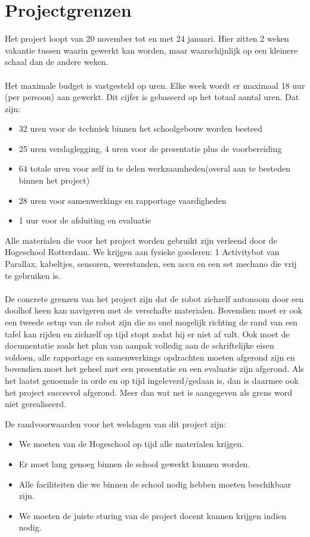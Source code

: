 \documentclass[oneside]{book}
\begin{document}
\clearpage
\chapter{Projectgrenzen}
Het project loopt van 20 november tot en met 24 januari. Hier zitten 2 weken vakantie tussen
waarin gewerkt kan worden, maar waarschijnlijk op een kleinere schaal dan de andere weken.\\
\\
Het maximale budget is vastgesteld op uren. Elke week wordt er maximaal 18 uur (per persoon) aan
gewerkt.
Dit cijfer is gebaseerd op het totaal aantal uren.
Dat zijn: 
\begin{itemize}
\item 32 uren voor de techniek binnen het schoolgebouw worden besteed
\item 25 uren verslaglegging, 4 uren voor de presentatie plus de voorbereiding
\item 64 totale uren voor zelf in te delen werkzaamheden(overal aan te besteden binnen het project)
\item 28 uren voor samenwerkings en rapportage vaardigheden  
\item 1 uur voor de afsluiting en evaluatie
\end{itemize}
Alle materialen die voor het project worden gebruikt zijn verleend door de Hogeschool
Rotterdam.
We krijgen aan fysieke goederen: 1 Activitybot van Parallax, kabeltjes, sensoren, weerstanden, een
accu en een set mechano die vrij te gebruiken is.\\
\\
De concrete grenzen van het project zijn dat de robot zichzelf
autonoom door een doolhof heen kan navigeren met
de verschafte materialen. 
Bovendien moet er ook een tweede setup van de robot zijn die zo snel
mogelijk richting de rand van een tafel kan rijden en zichzelf op tijd stopt zodat hij er niet af valt.
Ook moet de documentatie zoals het plan van aanpak volledig aan de schriftelijke eisen voldoen, alle rapportage
en samenwerkings opdrachten moeten
afgerond zijn en bovendien moet het geheel met een presentatie en een evaluatie zijn afgerond.
Als het laatst genoemde in orde en op tijd ingeleverd/gedaan is, dan is daarmee ook het project
succesvol afgerond.
Meer dan wat net is aangegeven als grens word niet gerealiseerd.

De randvoorwaarden voor het welslagen van dit project zijn: 
\begin{itemize}
\item We moeten van de Hogeschool op tijd alle materialen krijgen.
\item Er moet lang genoeg binnen de school gewerkt kunnen worden.
\item Alle faciliteiten die we binnen de school nodig hebben moeten beschikbaar zijn.
\item We moeten de juiste sturing van de project docent kunnen krijgen indien nodig.
\end{itemize}
\clearpage
\end{document}
